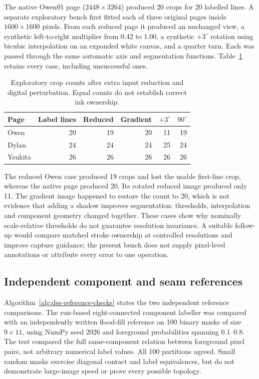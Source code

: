 The native Owen01 page ($2448\times3264$) produced 20 crops for 20 labelled lines. A separate exploratory bench first fitted each of three original pages inside $1600\times1600$ pixels. From each reduced page it produced an unchanged view, a synthetic left-to-right multiplier from 0.42 to 1.00, a synthetic $+3^\circ$ rotation using bicubic interpolation on an expanded white canvas, and a quarter turn. Each was passed through the same automatic axis and segmentation functions. Table~\ref{tab:des-resample-cases} retains every case, including unsuccessful ones.
\begin{table}[!htbp]\centering\small
\begin{tabular}{lrrrrr}\hline
Page & Label lines & Reduced & Gradient & $+3^\circ$ & $90^\circ$ \\\hline
Owen & 20 & 19 & 20 & 11 & 19 \\
Dylan & 24 & 24 & 24 & 25 & 24 \\
Yeukita & 26 & 26 & 26 & 26 & 26 \\
\hline\end{tabular}
\caption{Exploratory crop counts after extra input reduction and digital perturbation. Equal counts do not establish correct ink ownership.}
\label{tab:des-resample-cases}
\end{table}
The reduced Owen case produced 19 crops and lost the usable first-line crop, whereas the native page produced 20. Its rotated reduced image produced only 11. The gradient image happened to restore the count to 20, which is not evidence that adding a shadow improves segmentation: thresholds, interpolation and component geometry changed together. These cases show why nominally scale-relative thresholds do not guarantee resolution invariance. A suitable follow-up would compare matched stroke ownership at controlled resolutions and improve capture guidance; the present bench does not supply pixel-level annotations or attribute every error to one operation.

\subsection{Independent component and seam references}
Algorithm~\ref{alg:des-reference-checks} states the two independent reference comparisons.
The run-based eight-connected component labeller was compared with an independently written flood-fill reference on 100 binary masks of size $9\times11$, using NumPy seed 2026 and foreground probabilities spanning 0.1--0.8. The test compared the full same-component relation between foreground pixel pairs, not arbitrary numerical label values. All 100 partitions agreed. Small random masks exercise diagonal contact and label equivalences, but do not demonstrate large-image speed or prove every possible topology.

